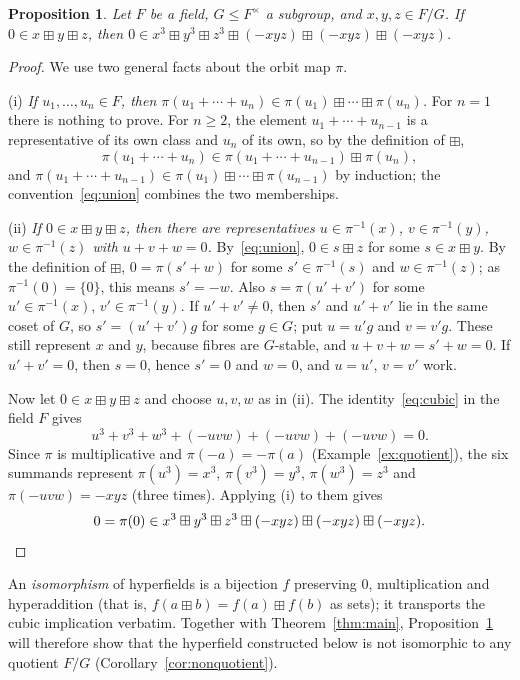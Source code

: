\documentclass[11pt]{article}
\theoremstyle{plain}
\newtheorem{proposition}[theorem]{Proposition}
\theoremstyle{definition}
\newcommand{\bp}{\boxplus}
\begin{document}
\begin{proposition}\label{prop:quotient}
Let $F$ be a field, $G\leq F^\times$ a subgroup, and $x,y,z\in F/G$.
If $0\in x\bp y\bp z$, then
$0\in x^3\bp y^3\bp z^3\bp(-xyz)\bp(-xyz)\bp(-xyz)$.
\end{proposition}
\begin{proof}
We use two general facts about the orbit map $\pi$.

\smallskip\noindent
(i) \emph{If $u_1,\dots,u_n\in F$, then
$\pi(u_1+\cdots+u_n)\in\pi(u_1)\bp\cdots\bp\pi(u_n)$.}
For $n=1$ there is nothing to prove.  For $n\geq2$, the element
$u_1+\cdots+u_{n-1}$ is a representative of its own class and $u_n$ of
its own, so by the definition of $\bp$,
\[
 \pi(u_1+\cdots+u_n)\in\pi(u_1+\cdots+u_{n-1})\bp\pi(u_n),
\]
and $\pi(u_1+\cdots+u_{n-1})\in\pi(u_1)\bp\cdots\bp\pi(u_{n-1})$ by
induction; the convention~\eqref{eq:union} combines the two memberships.

\smallskip\noindent
(ii) \emph{If $0\in x\bp y\bp z$, then there are representatives
$u\in\pi^{-1}(x)$, $v\in\pi^{-1}(y)$, $w\in\pi^{-1}(z)$ with
$u+v+w=0$.}  By~\eqref{eq:union}, $0\in s\bp z$ for some $s\in x\bp y$.
By the definition of $\bp$, $0=\pi(s'+w)$ for some $s'\in\pi^{-1}(s)$
and $w\in\pi^{-1}(z)$; as $\pi^{-1}(0)=\{0\}$, this means $s'=-w$.
Also $s=\pi(u'+v')$ for some $u'\in\pi^{-1}(x)$, $v'\in\pi^{-1}(y)$.
If $u'+v'\neq0$, then $s'$ and $u'+v'$ lie in the same coset of $G$, so
$s'=(u'+v')g$ for some $g\in G$; put $u=u'g$ and $v=v'g$.  These still
represent $x$ and $y$, because fibres are $G$-stable, and
$u+v+w=s'+w=0$.  If $u'+v'=0$, then $s=0$, hence $s'=0$ and $w=0$, and
$u=u'$, $v=v'$ work.

\smallskip
Now let $0\in x\bp y\bp z$ and choose $u,v,w$ as in (ii).  The
identity~\eqref{eq:cubic} in the field $F$ gives
\[
 u^3+v^3+w^3+(-uvw)+(-uvw)+(-uvw)=0.
\]
Since $\pi$ is multiplicative and $\pi(-a)=-\pi(a)$
(Example~\ref{ex:quotient}), the six summands represent
$\pi(u^3)=x^3$, $\pi(v^3)=y^3$, $\pi(w^3)=z^3$ and
$\pi(-uvw)=-xyz$ (three times).  Applying (i) to them gives
\[
 0=\pi(0)\in x^3\bp y^3\bp z^3\bp(-xyz)\bp(-xyz)\bp(-xyz).\qedhere
\]
\end{proof}

An \emph{isomorphism} of hyperfields is a bijection $f$ preserving $0$,
multiplication and hyperaddition (that is, $f(a\bp b)=f(a)\bp f(b)$ as
sets); it transports the cubic implication verbatim.  Together with
Theorem~\ref{thm:main}, Proposition~\ref{prop:quotient} will therefore
show that the hyperfield constructed below is not isomorphic to any
quotient $F/G$ (Corollary~\ref{cor:nonquotient}).
\end{document}
